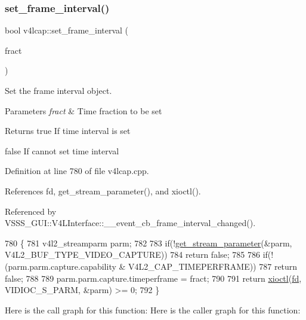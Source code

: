 \subsubsection{\texorpdfstring{set\+\_\+frame\+\_\+interval()}{set\_frame\_interval()}}
{\footnotesize\ttfamily bool v4lcap\+::set\+\_\+frame\+\_\+interval (\begin{DoxyParamCaption}\item[{struct v4l2\+\_\+fract \&}]{fract }\end{DoxyParamCaption})}



Set the frame interval object. 


\begin{DoxyParams}{Parameters}
{\em fract} & Time fraction to be set \\
\hline
\end{DoxyParams}
\begin{DoxyReturn}{Returns}
true If time interval is set 

false If cannot set time interval 
\end{DoxyReturn}


Definition at line 780 of file v4lcap.\+cpp.



References fd, get\+\_\+stream\+\_\+parameter(), and xioctl().



Referenced by V\+S\+S\+S\+\_\+\+G\+U\+I\+::\+V4\+L\+Interface\+::\+\_\+\+\_\+event\+\_\+cb\+\_\+frame\+\_\+interval\+\_\+changed().


\begin{DoxyCode}
780                                                          \{
781     v4l2\_streamparm parm;
782 
783     \textcolor{keywordflow}{if}(!\hyperlink{classv4lcap_a067a6b97d6c4d3ea83454132f1d3c87e}{get\_stream\_parameter}(&parm, V4L2\_BUF\_TYPE\_VIDEO\_CAPTURE))
784         \textcolor{keywordflow}{return} \textcolor{keyword}{false};
785 
786     \textcolor{keywordflow}{if}(!(parm.parm.capture.capability & V4L2\_CAP\_TIMEPERFRAME))
787         \textcolor{keywordflow}{return} \textcolor{keyword}{false};
788 
789     parm.parm.capture.timeperframe = fract;
790 
791     \textcolor{keywordflow}{return} \hyperlink{classv4lcap_ab5aaa5a8c0df17f5ca57e0b5170232cb}{xioctl}(\hyperlink{classv4lcap_a38109593bde997dad13b3a461569573d}{fd}, VIDIOC\_S\_PARM, &parm) >= 0;
792 \}
\end{DoxyCode}
Here is the call graph for this function\+:
Here is the caller graph for this function\+:
\mbox{\label{classv4lcap_a6ad01c926c3162e858e030c8525cb94b}} 
